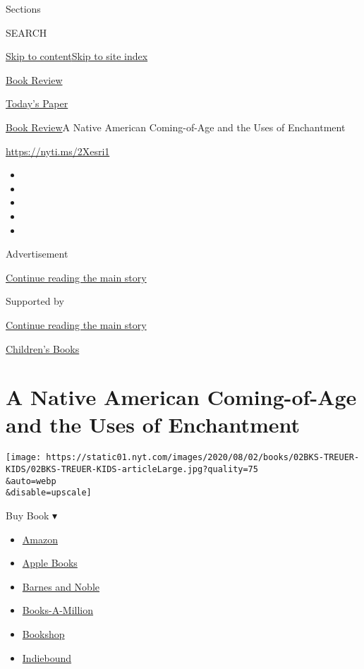 Sections

SEARCH

\protect\hyperlink{site-content}{Skip to
content}\protect\hyperlink{site-index}{Skip to site index}

\href{https://www.nytimes.com/section/books/review}{Book Review}

\href{https://myaccount.nytimes.com/auth/login?response_type=cookie\&client_id=vi}{}

\href{https://www.nytimes.com/section/todayspaper}{Today's Paper}

\href{/section/books/review}{Book Review}\textbar{}A Native American
Coming-of-Age and the Uses of Enchantment

\url{https://nyti.ms/2Xesri1}

\begin{itemize}
\item
\item
\item
\item
\item
\end{itemize}

Advertisement

\protect\hyperlink{after-top}{Continue reading the main story}

Supported by

\protect\hyperlink{after-sponsor}{Continue reading the main story}

\href{/column/childrens-books}{Children's Books}

\hypertarget{a-native-american-coming-of-age-and-the-uses-of-enchantment}{%
\section{A Native American Coming-of-Age and the Uses of
Enchantment}\label{a-native-american-coming-of-age-and-the-uses-of-enchantment}}

\texttt{[image: https://static01.nyt.com/images/2020/08/02/books/02BKS-TREUER-KIDS/02BKS-TREUER-KIDS-articleLarge.jpg?quality=75\\\&auto=webp\\\&disable=upscale]}

Buy Book ▾

\begin{itemize}
\tightlist
\item
  \href{https://www.amazon.com/gp/search?index=books\&tag=NYTBSREV-20\&field-keywords=The+Brave+James+Bird}{Amazon}
\item
  \href{https://du-gae-books-dot-nyt-du-prd.appspot.com/buy?title=The+Brave\&author=James+Bird}{Apple
  Books}
\item
  \href{https://www.anrdoezrs.net/click-7990613-11819508?url=https\%3A\%2F\%2Fwww.barnesandnoble.com\%2Fw\%2F\%3Fean\%3D9781250247759}{Barnes
  and Noble}
\item
  \href{https://www.anrdoezrs.net/click-7990613-35140?url=https\%3A\%2F\%2Fwww.booksamillion.com\%2Fp\%2FThe\%2BBrave\%2FJames\%2BBird\%2F9781250247759}{Books-A-Million}
\item
  \href{https://bookshop.org/a/3546/9781250247759}{Bookshop}
\item
  \href{https://www.indiebound.org/book/9781250247759?aff=NYT}{Indiebound}
\end{itemize}

